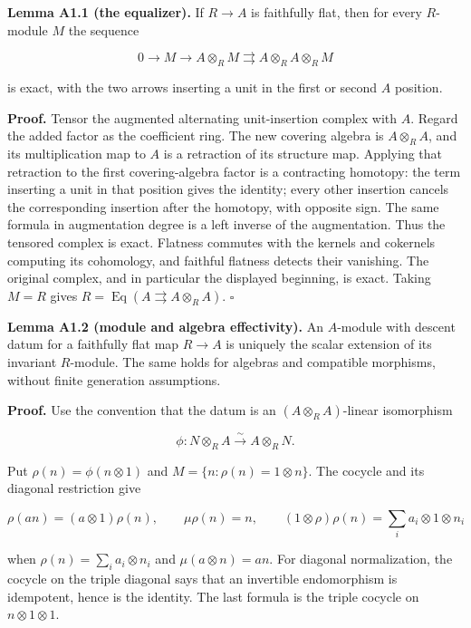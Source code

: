 \documentclass[11pt,a4paper,openany]{report}
\begin{document}
\textbf{Lemma A1.1 (the equalizer).} If \(R\to A\) is faithfully flat, then for every \(R\)-module \(M\) the sequence

\[
0\longrightarrow M\longrightarrow A\otimes_R M
\rightrightarrows A\otimes_R A\otimes_R M
\]

is exact, with the two arrows inserting a unit in the first or second \(A\) position.

\textbf{Proof.} Tensor the augmented alternating unit-insertion complex with \(A\). Regard the added factor as the coefficient ring. The new covering algebra is \(A\otimes_R A\), and its multiplication map to \(A\) is a retraction of its structure map. Applying that retraction to the first covering-algebra factor is a contracting homotopy: the term inserting a unit in that position gives the identity; every other insertion cancels the corresponding insertion after the homotopy, with opposite sign. The same formula in augmentation degree is a left inverse of the augmentation. Thus the tensored complex is exact. Flatness commutes with the kernels and cokernels computing its cohomology, and faithful flatness detects their vanishing. The original complex, and in particular the displayed beginning, is exact. Taking \(M=R\) gives \(R=\operatorname{Eq}(A\rightrightarrows A\otimes_R A)\). \(\square\)

\textbf{Lemma A1.2 (module and algebra effectivity).} An \(A\)-module with descent datum for a faithfully flat map \(R\to A\) is uniquely the scalar extension of its invariant \(R\)-module. The same holds for algebras and compatible morphisms, without finite generation assumptions.

\textbf{Proof.} Use the convention that the datum is an \((A\otimes_R A)\)-linear isomorphism

\[
\phi:N\otimes_R A\xrightarrow{\sim}A\otimes_R N.
\]

Put \(\rho(n)=\phi(n\otimes1)\) and \(M=\{n:\rho(n)=1\otimes n\}\). The cocycle and its diagonal restriction give

\[
\rho(an)=(a\otimes1)\rho(n),\qquad
\mu\rho(n)=n,\qquad
(1\otimes\rho)\rho(n)=\sum_i a_i\otimes1\otimes n_i
\]

when \(\rho(n)=\sum_i a_i\otimes n_i\) and \(\mu(a\otimes n)=an\). For diagonal normalization, the cocycle on the triple diagonal says that an invertible endomorphism is idempotent, hence is the identity. The last formula is the triple cocycle on \(n\otimes1\otimes1\).
\end{document}
